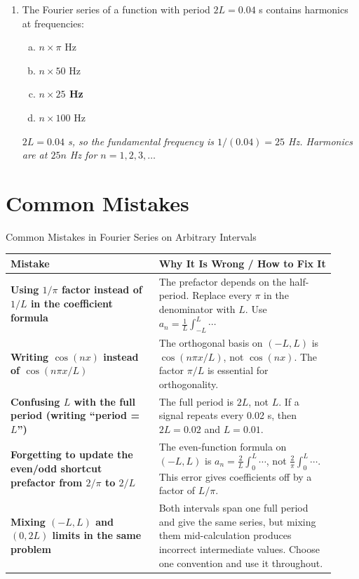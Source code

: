 \documentclass[12pt,a4paper]{article}
\begin{document}
\begin{enumerate}[leftmargin=*]
\medskip
\item The Fourier series of a function with period $2L = 0.04$ s contains harmonics at frequencies:
\begin{enumerate}[(a)]
  \item $n \times \pi$ Hz
  \item $n \times 50$ Hz
  \item \textbf{$n \times 25$ Hz}
  \item $n \times 100$ Hz
\end{enumerate}
\textit{$2L = 0.04$ s, so the fundamental frequency is $1/(0.04) = 25$ Hz. Harmonics are at $25n$ Hz for $n = 1,2,3,\ldots$}

\end{enumerate}

\section{Common Mistakes}

\begin{mistakebox}{Common Mistakes in Fourier Series on Arbitrary Intervals}
\begin{tabular}{>{\bfseries}p{0.42\linewidth} p{0.50\linewidth}}
\toprule
Mistake & Why It Is Wrong / How to Fix It \\
\midrule
Using $1/\pi$ factor instead of $1/L$ in the coefficient formula &
The prefactor depends on the half-period. Replace every $\pi$ in the denominator with $L$.
Use $a_n = \frac{1}{L}\int_{-L}^{L}\cdots$ \\
\midrule
Writing $\cos(nx)$ instead of $\cos(n\pi x/L)$ &
The orthogonal basis on $(-L,L)$ is $\cos(n\pi x/L)$, not $\cos(nx)$.
The factor $\pi/L$ is essential for orthogonality. \\
\midrule
Confusing $L$ with the full period (writing ``period = $L$'') &
The full period is $2L$, not $L$.
If a signal repeats every 0.02 s, then $2L = 0.02$ and $L = 0.01$. \\
\midrule
Forgetting to update the even/odd shortcut prefactor from $2/\pi$ to $2/L$ &
The even-function formula on $(-L,L)$ is $a_n = \frac{2}{L}\int_0^L\cdots$, not $\frac{2}{\pi}\int_0^L\cdots$.
This error gives coefficients off by a factor of $L/\pi$. \\
\midrule
Mixing $(-L,L)$ and $(0,2L)$ limits in the same problem &
Both intervals span one full period and give the same series, but mixing them mid-calculation produces incorrect intermediate values.
Choose one convention and use it throughout. \\
\bottomrule
\end{tabular}
\end{mistakebox}
\end{document}
